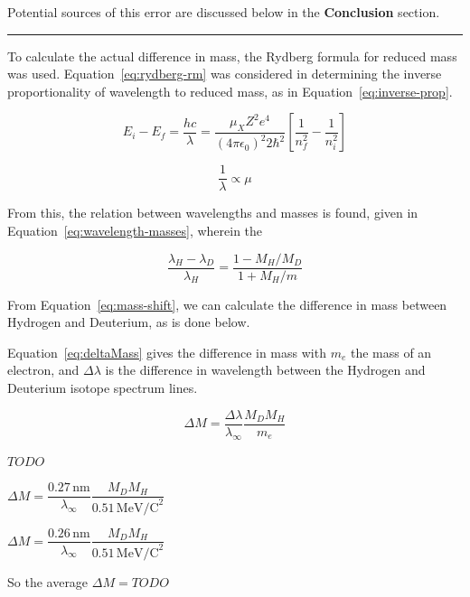 \documentclass[paper=a4, fontsize=11pt]{scrartcl} %
\numberwithin{equation}{section}
\numberwithin{figure}{section}
\numberwithin{table}{section}
\begin{document}
Potential sources of this error are discussed below in the \textbf{Conclusion} section.

\vspace{1.5em}
\hrule
\vspace{1.7em}

To calculate the actual difference in mass, the Rydberg formula for reduced mass was used. Equation~\ref{eq:rydberg-rm} was considered in determining the inverse proportionality of wavelength to reduced mass, as in Equation~\ref{eq:inverse-prop}.

\begin{equation}
\label{eq:rydberg-rm}
E_i - E_f = \dfrac{hc}{\lambda} = \dfrac{\mu_X Z^2 e^4}{\left( 4 \pi \epsilon_0 \right)^2 2 \hbar^2} \left[ \dfrac{1}{n^2_f} - \dfrac{1}{n_i^2} \right]
\end{equation}

\begin{equation}
\label{eq:inverse-prop}
\dfrac{1}{\lambda} \propto \mu
\end{equation}

From this, the relation between wavelengths and masses is found, given in Equation~\ref{eq:wavelength-masses}, wherein the 

\begin{equation}
\label{eq:wavelength-masses}
\dfrac{\lambda_H - \lambda_D}{\lambda_H} = \dfrac{1-M_H / M_D}{1+M_H/m}
\end{equation}


From Equation~\ref{eq:mass-shift}, we can calculate the difference in mass between Hydrogen and Deuterium, as is done below.

Equation~\ref{eq:deltaMass} gives the difference in mass with $m_e$ the mass of an electron, and $\Delta \lambda$ is the difference in wavelength between the Hydrogen and Deuterium isotope spectrum lines.

\begin{equation}
\label{eq:deltaMass}
\Delta M = \dfrac{\Delta\lambda}{\lambda_\infty} \dfrac{M_D M_H} {m_e}
\end{equation}

$TODO$

$\Delta M = \dfrac{ 0.27 \, \mathrm{nm} } { \lambda_\infty } \dfrac{ M_D M_H} { 0.51 \, \mathrm{MeV/C}^2 }$

$\Delta M = \dfrac{0.26 \, \mathrm{nm} } { \lambda_\infty } \dfrac{M_D M_H} { 0.51 \, \mathrm{MeV/C}^2}$

So the average $\Delta M = TODO$
\end{document}
